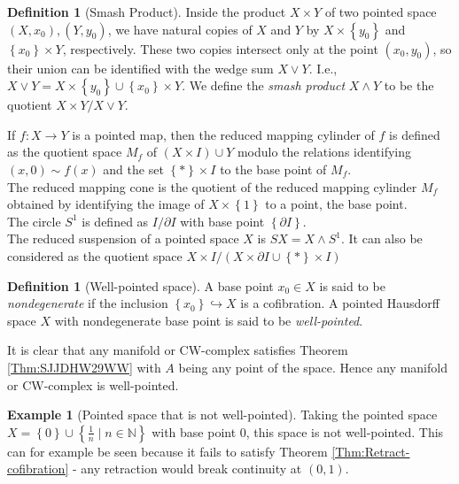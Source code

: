 \documentclass[reqno]{amsart}
\theoremstyle{definition}
\newtheorem{definition}[theorem]{Definition}
\newtheorem{example}[theorem]{Example}
\theoremstyle{remark}
\begin{document}
\begin{definition}[Smash Product]
    Inside the product $X \times Y$
    of two pointed space $(X,x_0), (Y,y_0)$,
    we have natural copies of $X$ and $Y$ by
    $X \times \left\{ y_0 \right\} $ and
    $\left\{ x_0 \right\} \times Y$, respectively.
    These two copies intersect only at the point
    $\left( x_0,y_0 \right) $, so their union can
    be identified with
    the wedge sum $X \vee Y$. I.e., $X \vee Y = 
    X \times \left\{ y_0 \right\} \cup 
    \left\{ x_0 \right\} \times Y$. We define
    the \textit{smash product} $X \wedge Y$ to be
    the quotient $X \times Y / X \vee Y$.
\end{definition}


If $f \colon X \to Y$ is a pointed map, then
the reduced mapping cylinder of $f$ is defined
as the quotient space $M_f$ of
$\left( X \times I \right) \cup  Y$ modulo the relations
identifying
$\left( x,0 \right) \sim f(x)$ and the set
$\left\{ * \right\} \times I$ to the base point of $M_f$.\\
The reduced mapping cone is the quotient of the reduced
mapping cylinder $M_f$ obtained by identifying the image of
$X \times \left\{ 1 \right\} $ to a point, the
base point.\\

The circle $S^{1}$ is defined as
$I / \partial I$ with base point $\left\{ \partial I \right\} $.\\
The reduced suspension of a pointed space $X$ is
$SX = X \wedge S^{1}$. It can also be considered
as the quotient space $X \times I / \left( X \times 
\partial I \cup  \left\{ * \right\} \times I\right) $


\begin{definition}[Well-pointed space]
    A base point $x_0 \in X$ is said to be
    \textit{nondegenerate} if the inclusion
    $\left\{ x_0 \right\} \hookrightarrow X$ is a cofibration.
    A pointed Hausdorff space $X$ with nondegenerate
    base point is said to be \textit{well-pointed}.
\end{definition}

It is clear that any manifold or CW-complex satisfies
Theorem \ref{Thm:SJJDHW29WW} with $A$ being any point of
the space. Hence any manifold or CW-complex is
well-pointed.\\

\begin{example}[Pointed space that is not well-pointed]
    Taking the pointed space  $X = 
    \left\{ 0 \right\} \cup  \left\{ \frac{1}{n} \mid 
    n \in \mathbb{N} \right\} $ with base point $0$, this
    space is not well-pointed. This can for example be
    seen because it fails to satisfy Theorem
    \ref{Thm:Retract-cofibration} - any retraction
    would break continuity at
    $\left( 0,1 \right) $.
\end{example}
\end{document}
